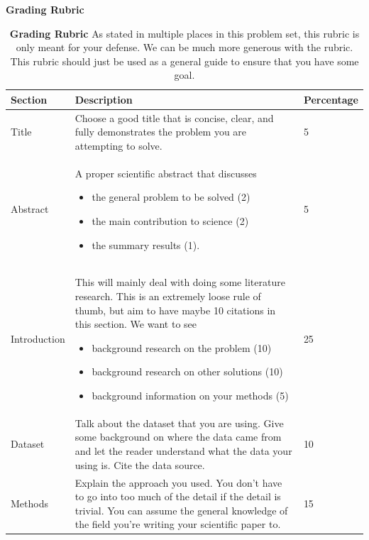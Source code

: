 \documentclass[10pt]{article}
\begin{document}
\clearpage
\noindent \Large \textbf{Grading Rubric} \normalsize \\
\noindent\makebox[\linewidth]{\rule{\textwidth}{0.4pt}}
\begin{table}[h]
 \caption{\textbf{Grading Rubric} \small{As stated in multiple places in this problem set, this rubric is only meant for your defense.  We can be much more generous with the rubric.  This rubric should just be used as a general guide to ensure that you have some goal.}}\label{table:Comparison}
\begin{center}
\begin{tabular}{L{2.5cm}|L{9cm}|L{2cm}}
\toprule[1.5pt]
Section & Description & Percentage \\
\midrule
\midrule
Title & Choose a good title that is concise, clear, and fully demonstrates the problem you are attempting to solve. & 5\\
Abstract & A proper scientific abstract that discusses
	\vspace{-3mm}
	\begin{itemize}[noitemsep]
	\item the general problem to be solved (2)
    \item the main contribution to science (2)
    \item the summary results (1).
	\end{itemize}& 5\\
Introduction & This will mainly deal with doing some literature research. This is an extremely loose rule of thumb, but aim to have maybe 10 citations in this section.  We want to see
	\vspace{-3mm}
    \begin{itemize}[noitemsep]
    \item background research on the problem (10)
    \item background research on other solutions (10)
    \item background information on your methods (5)
    \end{itemize}& 25\\
Dataset & Talk about the dataset that you are using. Give some background on where the data came from and let the reader understand what the data your using is.  Cite the data source. & 10 \\
Methods & Explain the approach you used. You don't have to go into too much of the detail if the detail is trivial.  You can assume the general knowledge of the field you're writing your scientific paper to. & 15 \\

\end{tabular}
\end{center}
\end{table}
\end{document}
